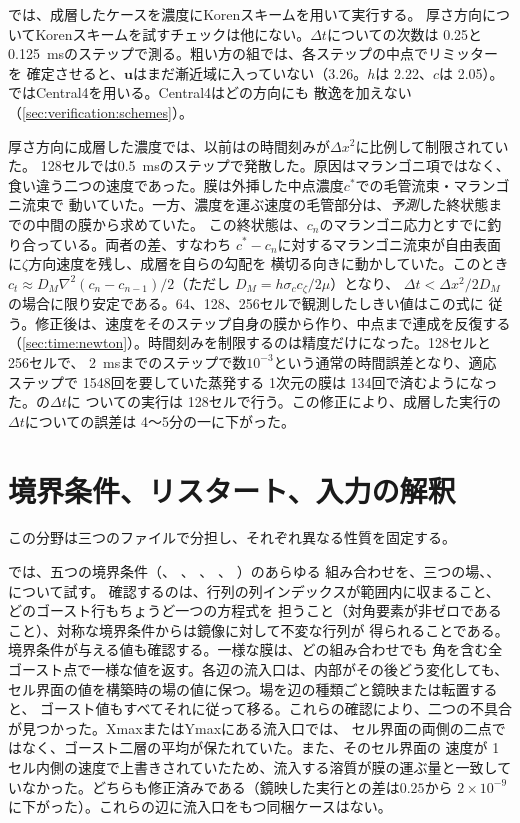 では、成層したケースを濃度にKorenスキームを用いて実行する。
厚さ方向についてKorenスキームを試すチェックは他にない。$\Delta t$についての次数は 0.25と
\SI{0.125}{\milli\second}のステップで測る。粗い方の組では、各ステップの中点でリミッターを
確定させると、$\mathbf u$はまだ漸近域に入っていない（3.26。$h$は 2.22、$c$は
2.05）。ではCentral4を用いる。Central4はどの方向にも
散逸を加えない（\cref{sec:verification:schemes}）。

厚さ方向に成層した濃度では、以前はの時間刻みが$\Delta x^2$に比例して制限されていた。
128セルでは\SI{0.5}{\milli\second}のステップで発散した。原因はマランゴニ項ではなく、
食い違う二つの速度であった。膜は外挿した中点濃度$c^*$での毛管流束・マランゴニ流束で
動いていた。一方、濃度を運ぶ速度の毛管部分は、\emph{予測}した終状態までの中間の膜から求めていた。
この終状態は、$c_n$のマランゴニ応力とすでに釣り合っている。両者の差、すなわち
$c^* - c_n$に対するマランゴニ流束が自由表面に$\zeta$方向速度を残し、成層を自らの勾配を
横切る向きに動かしていた。このとき$c_t \approx D_M\nabla^2(c_n - c_{n-1})/2$（ただし
$D_M = h\sigma_c c_\zeta/2\mu$）となり、
$\Delta t < \Delta x^2/2D_M$の場合に限り安定である。64、128、256セルで観測したしきい値はこの式に
従う。修正後は、速度をそのステップ自身の膜から作り、中点まで連成を反復する
（\cref{sec:time:newton}）。時間刻みを制限するのは精度だけになった。128セルと 256セルで、
\SI{2}{\milli\second}までのステップで数$10^{-3}$という通常の時間誤差となり、適応
ステップで 1548回を要していた蒸発する 1次元の膜は 134回で済むようになった。の$\Delta t$に
ついての実行は 128セルで行う。この修正により、成層した実行の$\Delta t$についての誤差は
4〜5分の一に下がった。

\section{境界条件、リスタート、入力の解釈}
\label{sec:verification:bcio}

この分野は三つのファイルで分担し、それぞれ異なる性質を固定する。

では、五つの境界条件（、
、 、 、 ）のあらゆる
組み合わせを、三つの場、、について試す。
確認するのは、行列の列インデックスが範囲内に収まること、どのゴースト行もちょうど一つの方程式を
担うこと（対角要素が非ゼロであること）、対称な境界条件からは鏡像に対して不変な行列が
得られることである。境界条件が与える値も確認する。一様な膜は、どの組み合わせでも
角を含む全ゴースト点で一様な値を返す。各辺の流入口は、内部がその後どう変化しても、
セル界面の値を構築時の場の値に保つ。場を辺の種類ごと鏡映または転置すると、
ゴースト値もすべてそれに従って移る。これらの確認により、二つの不具合が見つかった。XmaxまたはYmaxにある流入口では、
セル界面の両側の二点ではなく、ゴースト二層の平均が保たれていた。また、そのセル界面の
速度が 1セル内側の速度で上書きされていたため、流入する溶質が膜の運ぶ量と一致して
いなかった。どちらも修正済みである（鏡映した実行との差は$0.25$から
$2\times10^{-9}$に下がった）。これらの辺に流入口をもつ同梱ケースはない。


